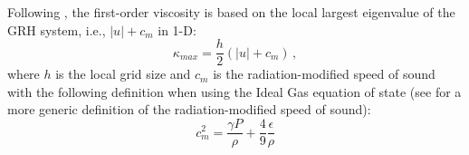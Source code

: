 \documentclass[times]{fldauth}
\begin{document}
Following \cite{our_jcp_radhy_paper}, the first-order viscosity is based on the local largest eigenvalue of the GRH system, i.e., $|u| + c_m$ in 1-D:
%
\begin{equation}
\label{eq:equation8}
\kappa_{max} = \frac{h}{2} \left( |u| + c_m \right) \,,
\end{equation}  
%
where $h$ is the local grid size and $c_m$ is the radiation-modified speed of sound with the following definition when using the Ideal Gas equation of state (see \cite{our_jcp_radhy_paper} for a more generic definition of the radiation-modified speed of sound):
%
\begin{equation}
c_m^2 = \frac{ \gamma P}{\rho} + \frac{4}{9} \frac{\epsilon}{\rho}
\end{equation}
%
 
\end{document}
